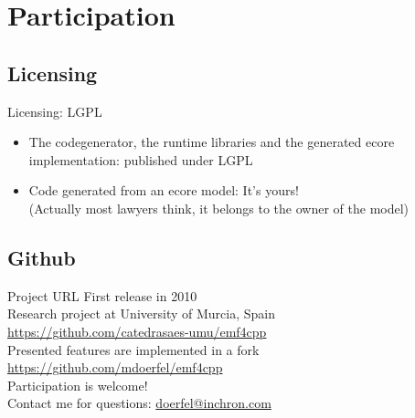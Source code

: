 \documentclass[pdf, 10pt]{beamer}
\begin{document}
\section{Participation}

\subsection{Licensing}

\begin{frame}{Licensing: LGPL}
  \begin{itemize}
  \item The codegenerator, the runtime libraries and the generated
    ecore implementation: published under LGPL
  \item Code generated from an ecore model: It's yours!\\
    (Actually most lawyers think, it belongs to the owner of the model)
  \end{itemize}
\end{frame}

\subsection{Github}

\begin{frame}{Project URL}
First release in 2010\\
Research project at University of Murcia, Spain\\
\href{https://github.com/catedrasaes-umu/emf4cpp}{https://github.com/catedrasaes-umu/emf4cpp}\\[1em]

Presented features are implemented in a fork\\
\href{https://github.com/mdoerfel/emf4cpp}{https://github.com/mdoerfel/emf4cpp}\\[1em]

Participation is welcome!\\[1em]
Contact me for questions: \href{mailto:doerfel@inchron.com}{doerfel@inchron.com}
\end{frame}

\end{document}
